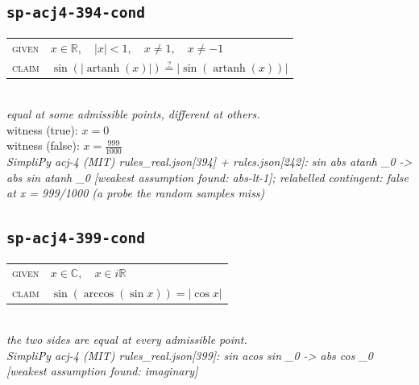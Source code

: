 \documentclass[11pt]{article}
\begin{document}
\subsection*{\texttt{sp-acj4-394-cond}}
\begin{tabular}{@{}l@{\quad}l@{}}
\textsc{given} & $x \in \mathbb{R},\quad \left|x\right| < 1,\quad x \neq 1,\quad x \neq -1$ \\[4pt]
\textsc{claim} & $\displaystyle \sin\left(\left|\operatorname{artanh}\left(x\right)\right|\right) \overset{?}{=} \left|\sin\left(\operatorname{artanh}\left(x\right)\right)\right|$ \\
\end{tabular}\\[2pt]
{\small\emph{equal at some admissible points, different at others.}}\\
{\footnotesize\color{gray}witness (true): $x = 0$}\\
{\footnotesize\color{gray}witness (false): $x = \frac{999}{1000}$}\\
\emph{SimpliPy acj-4 (MIT) rules\_real.json[394] + rules.json[242]: sin abs atanh \_0  ->  abs sin atanh \_0  [weakest assumption found: abs-lt-1]; relabelled contingent: false at x = 999/1000 (a probe the random samples miss)}\\

\subsection*{\texttt{sp-acj4-399-cond}}
\begin{tabular}{@{}l@{\quad}l@{}}
\textsc{given} & $x \in \mathbb{C},\quad x \in i\mathbb{R}$ \\[4pt]
\textsc{claim} & $\displaystyle \sin\left(\arccos\left(\sin x\right)\right) = \left|\cos x\right|$ \\
\end{tabular}\\[2pt]
{\small\emph{the two sides are equal at every admissible point.}}\\
\emph{SimpliPy acj-4 (MIT) rules\_real.json[399]: sin acos sin \_0  ->  abs cos \_0  [weakest assumption found: imaginary]}\\
\end{document}
